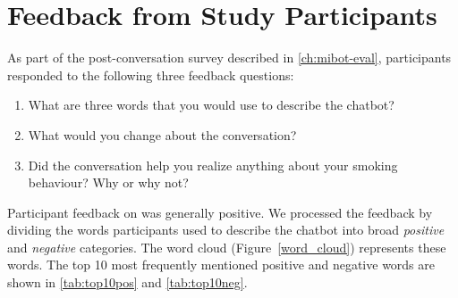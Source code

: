 \chapter{\sysname Feedback from Study Participants}
\label{app-feedback}

As part of the post-conversation survey described in \cref{ch:mibot-eval}, participants responded to the following three feedback questions:

\begin{tcolorbox}[breakable,
                  colback=magenta!5!blue!10,        %
  colframe=magenta!60!blue!40,      %
                  fonttitle=\bfseries, %
                  fontupper=\small,
                  title=Feedback Survey Questions]

\begin{enumerate}
    \item What are three words that you would use to describe the chatbot?
    \item What would you change about the conversation?
    \item Did the conversation help you realize anything about your smoking behaviour? Why or why not?
\end{enumerate}

\end{tcolorbox}



Participant feedback on \sysname was generally positive. We processed the feedback by dividing the words participants used to describe the chatbot into broad \textit{positive} and \textit{negative} categories. The word cloud (Figure~\ref{word_cloud}) represents these words. The top 10 most frequently mentioned positive and negative words are shown in \cref{tab:top10pos} and \cref{tab:top10neg}.


\renewcommand{\thetable}{J.\arabic{table}}
\setcounter{table}{0}

